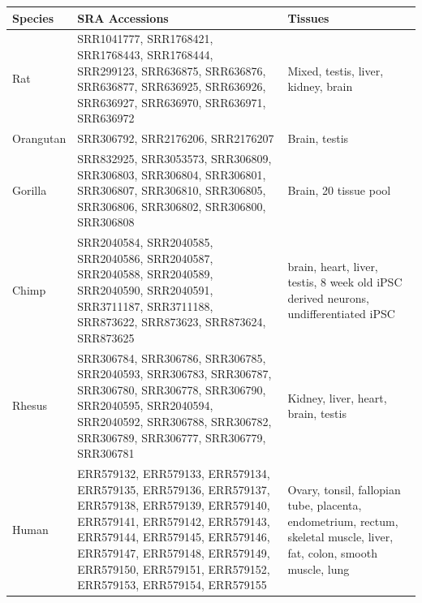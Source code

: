 \documentclass[fleqn,10pt]{wlscirep}
\begin{document}
\begin{center}
\small
{}
\label{supp_table:rnaseq_sra_table}
\begin{longtable}{|p{}|p{}|p{}|} \hline
Species  & SRA Accessions & Tissues \\ \hline
Rat    & SRR1041777, SRR1768421, SRR1768443, SRR1768444, SRR299123, SRR636875, SRR636876, SRR636877, SRR636925, SRR636926, SRR636927, SRR636970, SRR636971, SRR636972                                                                                                                                          & Mixed, testis, liver, kidney, brain                                          \\ \hline
Orangutan & SRR306792, SRR2176206, SRR2176207                                                                                                                                                                                                       & Brain, testis                                                     \\ \hline
Gorilla  & SRR832925, SRR3053573, SRR306809, SRR306803, SRR306804, SRR306801, SRR306807, SRR306810, SRR306805, SRR306806, SRR306802, SRR306800, SRR306808                                                                                                                                                 & Brain, 20 tissue pool                                                 \\ \hline
Chimp   & SRR2040584, SRR2040585, SRR2040586, SRR2040587, SRR2040588, SRR2040589, SRR2040590, SRR2040591, SRR3711187, SRR3711188, SRR873622, SRR873623, SRR873624, SRR873625                                                                                                                                       & brain, heart, liver, testis, 8 week old iPSC derived neurons, undifferentiated iPSC                  \\ \hline
Rhesus  & SRR306784, SRR306786, SRR306785, SRR2040593, SRR306783, SRR306787, SRR306780, SRR306778, SRR306790, SRR2040595, SRR2040594, SRR2040592, SRR306788, SRR306782, SRR306789, SRR306777, SRR306779, SRR306781                                                                                                                    &  Kidney, liver, heart, brain, testis                                                          \\ \hline
Human   & ERR579132, ERR579133, ERR579134, ERR579135, ERR579136, ERR579137, ERR579138, ERR579139, ERR579140, ERR579141, ERR579142, ERR579143, ERR579144, ERR579145, ERR579146, ERR579147, ERR579148, ERR579149, ERR579150, ERR579151, ERR579152, ERR579153, ERR579154, ERR579155                                                                                     & Ovary, tonsil, fallopian tube, placenta, endometrium, rectum, skeletal muscle, liver, fat, colon, smooth muscle, lung \\ \hline

\end{longtable}
\end{center}
\end{document}
